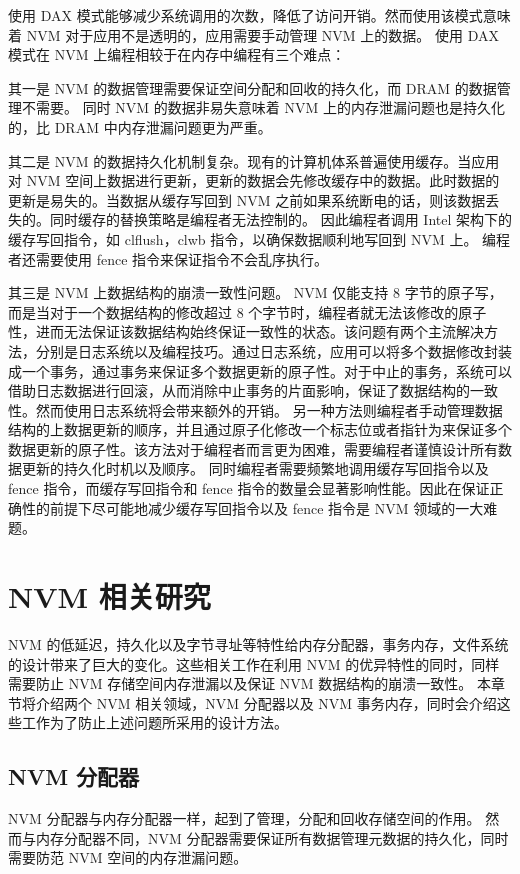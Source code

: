 使用 DAX 模式能够减少系统调用的次数，降低了访问开销。然而使用该模式意味着 NVM 对于应用不是透明的，应用需要手动管理 NVM 上的数据。
使用 DAX 模式在 NVM 上编程相较于在内存中编程有三个难点：

其一是 NVM 的数据管理需要保证空间分配和回收的持久化，而 DRAM 的数据管理不需要。
同时 NVM 的数据非易失意味着 NVM 上的内存泄漏问题也是持久化的，比 DRAM 中内存泄漏问题更为严重。

其二是 NVM 的数据持久化机制复杂。现有的计算机体系普遍使用缓存。当应用对 NVM 空间上数据进行更新，更新的数据会先修改缓存中的数据。此时数据的更新是易失的。当数据从缓存写回到 NVM 之前如果系统断电的话，则该数据丢失的。同时缓存的替换策略是编程者无法控制的。
因此编程者调用 Intel 架构下的缓存写回指令，如 clflush，clwb 指令，以确保数据顺利地写回到 NVM 上。
编程者还需要使用 fence 指令来保证指令不会乱序执行。

其三是 NVM 上数据结构的崩溃一致性问题。
NVM 仅能支持 8 字节的原子写，而是当对于一个数据结构的修改超过 8 个字节时，编程者就无法该修改的原子性，进而无法保证该数据结构始终保证一致性的状态。该问题有两个主流解决方法，分别是日志系统以及编程技巧。通过日志系统，应用可以将多个数据修改封装成一个事务，通过事务来保证多个数据更新的原子性。对于中止的事务，系统可以借助日志数据进行回滚，从而消除中止事务的片面影响，保证了数据结构的一致性。然而使用日志系统将会带来额外的开销。
另一种方法则编程者手动管理数据结构的上数据更新的顺序，并且通过原子化修改一个标志位或者指针为来保证多个数据更新的原子性。该方法对于编程者而言更为困难，需要编程者谨慎设计所有数据更新的持久化时机以及顺序。
同时编程者需要频繁地调用缓存写回指令以及 fence 指令，而缓存写回指令和 fence 指令的数量会显著影响性能。因此在保证正确性的前提下尽可能地减少缓存写回指令以及 fence 指令是 NVM 领域的一大难题。

\section{NVM 相关研究}

NVM 的低延迟，持久化以及字节寻址等特性给内存分配器，事务内存，文件系统的设计带来了巨大的变化。这些相关工作在利用 NVM 的优异特性的同时，同样需要防止 NVM 存储空间内存泄漏以及保证 NVM 数据结构的崩溃一致性。
本章节将介绍两个 NVM 相关领域，NVM 分配器以及 NVM 事务内存，同时会介绍这些工作为了防止上述问题所采用的设计方法。

\subsection{NVM 分配器}

NVM 分配器与内存分配器一样，起到了管理，分配和回收存储空间的作用。
然而与内存分配器不同，NVM 分配器需要保证所有数据管理元数据的持久化，同时需要防范 NVM 空间的内存泄漏问题。

